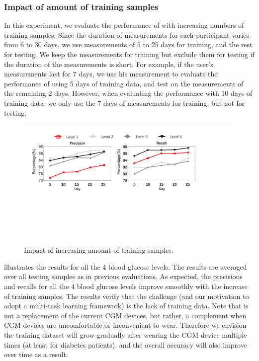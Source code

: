\subsubsection{Impact of amount of training samples}
In this experiment, we evaluate the performance of \sysname with increasing numbers of training samples.
Since the duration of measurements for each participant varies from 6 to 30 days, we use measurements of 5 to 25 days for training, and the rest for testing.
We keep the measurements for training but exclude them for testing if the duration of the measurements is short.
For example, if the user's measurements last for 7 days, we use his measurement to evaluate the performance of using 5 days of training data, and test on the measurements of the remaining 2 days.
However, when evaluating the performance with 10 days of training data, we only use the 7 days of measurements for training, but not for testing.

\begin{figure}[h]
  \centering
  \includegraphics[width=0.9\columnwidth]{./img/performance_under_days1.pdf}
  \caption{Impact of increasing amount of training samples.}
  \label{fig:per_under_train_days}
\end{figure}

 illustrates the results for all the 4 blood glucose levels.
The results are averaged over all testing samples as in previous evaluations.
As expected, the precisions and recalls for all the 4 blood glucose levels improve smoothly with the increase of training samples.
The results verify that the challenge (and our motivation to adopt a multi-task learning framework) is the lack of training data.
Note that \sysname is not a replacement of the current CGM devices, but rather, a complement when CGM devices are uncomfortable or inconvenient to wear.
Therefore we envision the training dataset will grow gradually after wearing the CGM device multiple times (at least for diabetes patients), and the overall accuracy will also improve over time as a result.



